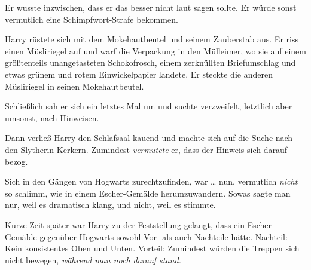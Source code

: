Er wusste inzwischen, dass er das besser nicht laut sagen sollte. Er würde sonst vermutlich eine Schimpfwort-Strafe bekommen.

Harry rüstete sich mit dem Mokehautbeutel und seinem Zauberstab aus. Er riss einen Müsliriegel auf und warf die Verpackung in den Mülleimer, wo sie auf einem größtenteils unangetasteten Schokofrosch, einem zerknüllten Briefumschlag und etwas grünem und rotem Einwickelpapier landete. Er steckte die anderen Müsliriegel in seinen Mokehautbeutel.

Schließlich sah er sich ein letztes Mal um und suchte verzweifelt, letztlich aber umsonst, nach Hinweisen.

Dann verließ Harry den Schlafsaal kauend und machte sich auf die Suche nach den Slytherin-Kerkern. Zumindest \emph{vermutete} er, dass der Hinweis sich darauf bezog.

Sich in den Gängen von Hogwarts zurechtzufinden, war … nun, vermutlich \emph{nicht} so schlimm, wie in einem Escher-Gemälde herumzuwandern. Sowas sagte man nur, weil es dramatisch klang, und nicht, weil es stimmte.

Kurze Zeit später war Harry zu der Feststellung gelangt, dass ein Escher-Gemälde gegenüber Hogwarts sowohl Vor- als auch Nachteile hätte. Nachteil: Kein konsistentes Oben und Unten. Vorteil: Zumindest würden die Treppen sich nicht bewegen, \emph{während man noch darauf stand.}

